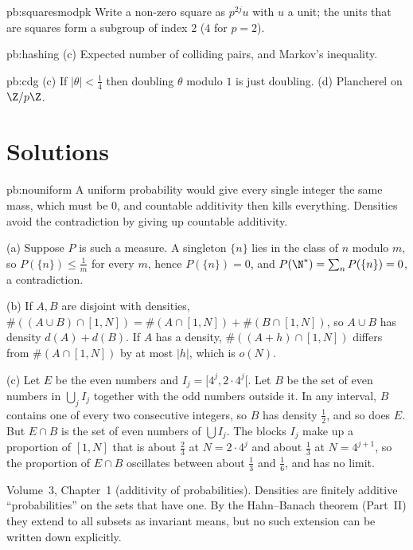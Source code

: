\begin{hint}{pb:squaresmodpk}
Write a non-zero square as $p^{2j}u$ with $u$ a unit; the units that are squares form a subgroup of index $2$ ($4$ for $p=2$).
\end{hint}

\begin{hint}{pb:hashing}
(c) Expected number of colliding pairs, and Markov's inequality.
\end{hint}

\begin{hint}{pb:cdg}
(c) If $|\theta|<\frac14$ then doubling $\theta$ modulo $1$ is just doubling. (d) Plancherel on $\Z/p\Z$.
\end{hint}

\section{Solutions}

\begin{solution}{pb:nouniform}
\idea A uniform probability would give every single integer the same mass, which must be $0$, and countable additivity then
kills everything. Densities avoid the contradiction by giving up countable additivity.

\writeup (a) Suppose $P$ is such a measure. A singleton $\{n\}$ lies in the class of $n$ modulo $m$, so $P(\{n\})\le\frac1m$ for
every $m$, hence $P(\{n\})=0$, and $P(\N^*)=\sum_nP(\{n\})=0$, a contradiction.

(b) If $A,B$ are disjoint with densities, $\#((A\cup B)\cap[1,N])=\#(A\cap[1,N])+\#(B\cap[1,N])$, so $A\cup B$ has density
$d(A)+d(B)$. If $A$ has a density, $\#((A+h)\cap[1,N])$ differs from $\#(A\cap[1,N])$ by at most $|h|$, which is $o(N)$.

(c) Let $E$ be the even numbers and $I_j=[4^j,2\cdot4^j[$. Let $B$ be the set of even numbers in $\bigcup_jI_j$ together with the
odd numbers outside it. In any interval, $B$ contains one of every two consecutive integers, so $B$ has density $\frac12$, and
so does $E$. But $E\cap B$ is the set of even numbers of $\bigcup I_j$. The blocks $I_j$ make up a proportion of $[1,N]$ that is
about $\frac23$ at $N=2\cdot4^j$ and about $\frac13$ at $N=4^{j+1}$, so the proportion of $E\cap B$ oscillates between about
$\frac13$ and $\frac16$, and has no limit.

\tools Volume~3, Chapter~1 (additivity of probabilities).
\leads Densities are finitely additive ``probabilities'' on the sets that have one. By the Hahn--Banach theorem (Part~II) they
extend to all subsets as invariant means, but no such extension can be written down explicitly.
\end{solution}


